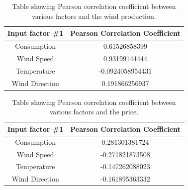 \begin{table}[H]
\centering  %
\begin{tabular}{c c} %
Input factor \#1 & Pearson Correlation Coefficient \\ [0.5ex] %
\hline                  %
Consumption & 0.61526858399 \\ %
Wind Speed & 0.93199144444 \\
Temperature & -0.0924058954431 \\
Wind Direction & 0.191866256937 \\ [1ex] %
\hline %
\end{tabular}
\caption{Table showing Pearson correlation coefficient between various factors and the wind production.} %
\label{table:pearsonCoeficient} %
\end{table}

\begin{table}[H]
\centering  %
\begin{tabular}{c c} %
Input factor \#1 & Pearson Correlation Coefficient \\ [0.5ex] %
\hline                  %
Consumption & 0.281301381724 \\ %
Wind Speed & -0.271821873508 \\
Temperature & -0.147262088023 \\
Wind Direction & -0.161895363332 \\ [1ex] %
\hline %
\end{tabular}
\caption{Table showing Pearson correlation coefficient between various factors and the price.} %
\label{table:pearsonCoeficient} %
\end{table}